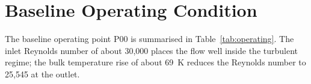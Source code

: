 \section{Baseline Operating Condition}
The baseline operating point P00 is summarised in Table~\ref{tab:operating}. The inlet Reynolds number of about 30,000 places the flow well
inside the turbulent regime; the bulk temperature rise of about 69~K reduces the Reynolds number to 25,545 at the outlet.


